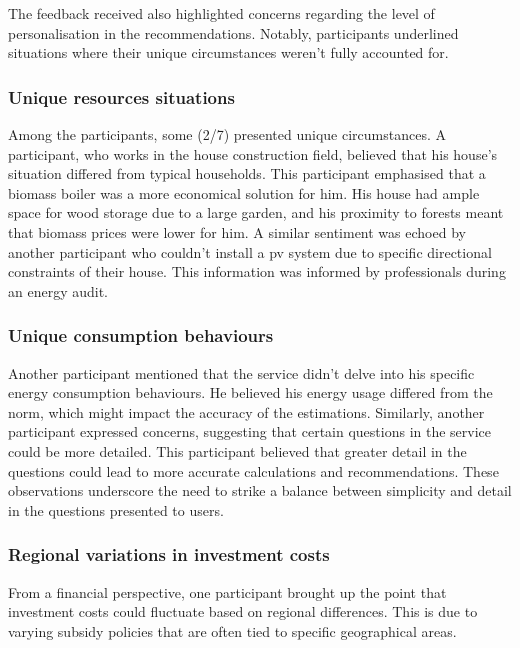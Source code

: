 The feedback received also highlighted concerns regarding the level of personalisation in the recommendations. 
Notably, participants underlined situations where their unique circumstances weren't fully accounted for.


\subsubsection*{Unique resources situations}

Among the participants, some (2/7) presented unique circumstances. 
A participant, who works in the house construction field, believed that his house's situation differed from typical households. 
This participant emphasised that a biomass boiler was a more economical solution for him.
His house had ample space for wood storage due to a large garden, and his proximity to forests meant that biomass prices were lower for him. 
A similar sentiment was echoed by another participant who couldn't install a \gls{pv} system due to specific directional constraints of their house. 
This information was informed by professionals during an energy audit.


\subsubsection*{Unique consumption behaviours}

Another participant mentioned that the service didn't delve into his specific energy consumption behaviours. 
He believed his energy usage differed from the norm, which might impact the accuracy of the estimations. 
Similarly, another participant expressed concerns, suggesting that certain questions in the service could be more detailed. 
This participant believed that greater detail in the questions could lead to more accurate calculations and recommendations. 
These observations underscore the need to strike a balance between simplicity and detail in the questions presented to users. 


\subsubsection*{Regional variations in investment costs}

From a financial perspective, one participant brought up the point that investment costs could fluctuate based on regional differences. 
This is due to varying subsidy policies that are often tied to specific geographical areas.


